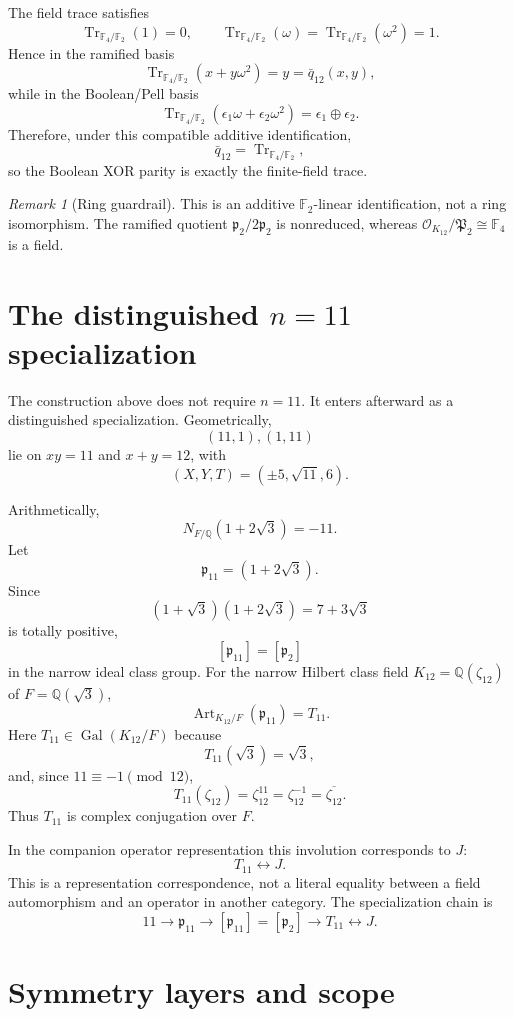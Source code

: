 \documentclass[11pt]{article}
\theoremstyle{remark}
\newtheorem{remark}[theorem]{Remark}
\newcommand{\Q}{\mathbb Q}
\newcommand{\F}{\mathbb F}
\newcommand{\OO}{\mathcal O}
\newcommand{\Gal}{\operatorname{Gal}}
\newcommand{\Tr}{\operatorname{Tr}}
\newcommand{\Art}{\operatorname{Art}}
\begin{document}
The field trace satisfies
\[
\Tr_{\F_4/\F_2}(1)=0,
\qquad
\Tr_{\F_4/\F_2}(\omega)
=\Tr_{\F_4/\F_2}(\omega^2)=1.
\]
Hence in the ramified basis
\[
\Tr_{\F_4/\F_2}(x+y\omega^2)=y=\bar q_{12}(x,y),
\]
while in the Boolean/Pell basis
\[
\boxed{
\Tr_{\F_4/\F_2}
(\epsilon_1\omega+\epsilon_2\omega^2)
=\epsilon_1\oplus\epsilon_2.}
\]
Therefore, under this compatible additive identification,
\[
\boxed{\bar q_{12}=\Tr_{\F_4/\F_2},}
\]
so the Boolean XOR parity is exactly the finite-field trace.

\begin{remark}[Ring guardrail]
This is an additive $\F_2$-linear identification, not a ring isomorphism.
The ramified quotient $\mathfrak p_2/2\mathfrak p_2$ is nonreduced, whereas
$\OO_{K_{12}}/\mathfrak P_2\cong\F_4$ is a field.
\end{remark}

\section{The distinguished $n=11$ specialization}

The construction above does not require $n=11$.  It enters afterward as a
distinguished specialization.  Geometrically,
\[
(11,1),(1,11)
\]
lie on $xy=11$ and $x+y=12$, with
\[
(X,Y,T)=(\pm5,\sqrt{11},6).
\]

Arithmetically,
\[
N_{F/\Q}(1+2\sqrt3)=-11.
\]
Let
\[
\mathfrak p_{11}=(1+2\sqrt3).
\]
Since
\[
(1+\sqrt3)(1+2\sqrt3)=7+3\sqrt3
\]
is totally positive,
\[
\boxed{[\mathfrak p_{11}]=[\mathfrak p_2]}
\]
in the narrow ideal class group.  For the narrow Hilbert class field
$K_{12}=\Q(\zeta_{12})$ of $F=\Q(\sqrt3)$,
\[
\boxed{\Art_{K_{12}/F}(\mathfrak p_{11})=T_{11}.}
\]
Here $T_{11}\in\Gal(K_{12}/F)$ because
\[
T_{11}(\sqrt3)=\sqrt3,
\]
and, since $11\equiv-1\pmod{12}$,
\[
T_{11}(\zeta_{12})
=\zeta_{12}^{11}
=\zeta_{12}^{-1}
=\overline{\zeta_{12}}.
\]
Thus $T_{11}$ is complex conjugation over $F$.

In the companion operator representation this involution corresponds to $J$:
\[
\boxed{T_{11}\longleftrightarrow J.}
\]
This is a representation correspondence, not a literal equality between a
field automorphism and an operator in another category.  The specialization
chain is
\[
\boxed{
11\longrightarrow\mathfrak p_{11}
\longrightarrow[\mathfrak p_{11}]=[\mathfrak p_2]
\longrightarrow T_{11}\longleftrightarrow J.}
\]

\section{Symmetry layers and scope}
\end{document}
